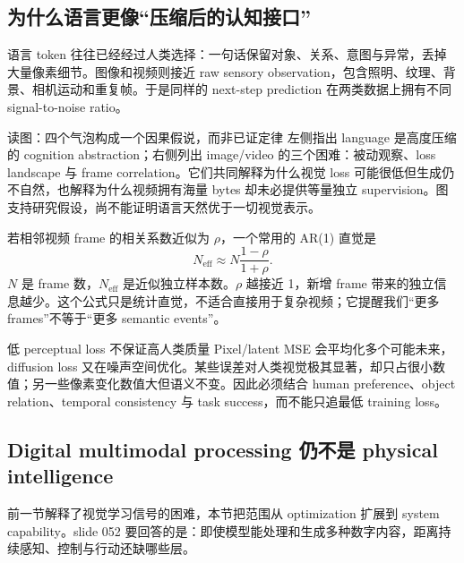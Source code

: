 \subsection{为什么语言更像“压缩后的认知接口”}

语言 token 往往已经经过人类选择：一句话保留对象、关系、意图与异常，丢掉大量像素细节。图像和视频则接近 raw sensory observation，包含照明、纹理、背景、相机运动和重复帧。于是同样的 next-step prediction 在两类数据上拥有不同 signal-to-noise ratio。


\begin{knowledgebox}{读图：四个气泡构成一个因果假说，而非已证定律}
左侧指出 language 是高度压缩的 cognition abstraction；右侧列出 image/video 的三个困难：被动观察、loss landscape 与 frame correlation。它们共同解释为什么视觉 loss 可能很低但生成仍不自然，也解释为什么视频拥有海量 bytes 却未必提供等量独立 supervision。图支持研究假设，尚不能证明语言天然优于一切视觉表示。
\end{knowledgebox}

若相邻视频 frame 的相关系数近似为 $\rho$，一个常用的 AR(1) 直觉是
$$
N_{\text{eff}}\approx N\frac{1-\rho}{1+\rho}.
$$
$N$ 是 frame 数，$N_{\text{eff}}$ 是近似独立样本数。$\rho$ 越接近 1，新增 frame 带来的独立信息越少。这个公式只是统计直觉，不适合直接用于复杂视频；它提醒我们“更多 frames”不等于“更多 semantic events”。

\begin{warningbox}{低 perceptual loss 不保证高人类质量}
Pixel/latent MSE 会平均化多个可能未来，diffusion loss 又在噪声空间优化。某些误差对人类视觉极其显著，却只占很小数值；另一些像素变化数值大但语义不变。因此必须结合 human preference、object relation、temporal consistency 与 task success，而不能只追最低 training loss。
\end{warningbox}


\subsection{Digital multimodal processing 仍不是 physical intelligence}

前一节解释了视觉学习信号的困难，本节把范围从 optimization 扩展到 system capability。slide 052 要回答的是：即使模型能处理和生成多种数字内容，距离持续感知、控制与行动还缺哪些层。

